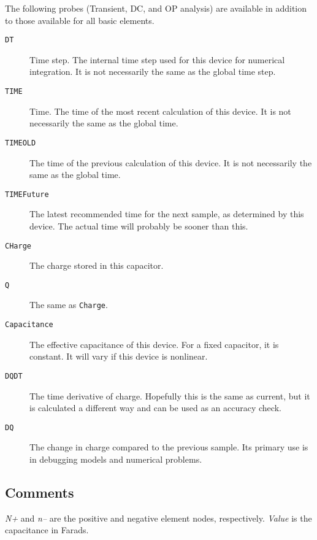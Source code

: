 The following probes (Transient, DC, and OP analysis) are available in
addition to those available for all basic elements.

\begin{description}
  
\item[{\tt DT}] Time step.  The internal time step used for this
  device for numerical integration.  It is not necessarily the same as
  the global time step.
  
\item[{\tt TIME}] Time.  The time of the most recent calculation of
  this device.  It is not necessarily the same as the global time.
  
\item[{\tt TIMEOLD}] The time of the previous calculation of this
  device.  It is not necessarily the same as the global time.
  
\item[{\tt TIMEFuture}] The latest recommended time for the next
  sample, as determined by this device.  The actual time will probably
  be sooner than this.
  
\item[{\tt CHarge}] The charge stored in this capacitor.
  
\item[{\tt Q}] The same as {\tt Charge}.
  
\item[{\tt Capacitance}] The effective capacitance of this device.
  For a fixed capacitor, it is constant.  It will vary if this device
  is nonlinear.
  
\item[{\tt DQDT}] The time derivative of charge.  Hopefully this is
  the same as current, but it is calculated a different way and can be
  used as an accuracy check.
  
\item[{\tt DQ}] The change in charge compared to the previous sample.
  Its primary use is in debugging models and numerical problems.

\end{description}
\subsection{Comments}

{\it N+} and {\it n--} are the positive and negative element nodes,
respectively.  {\it Value} is the capacitance in Farads.


